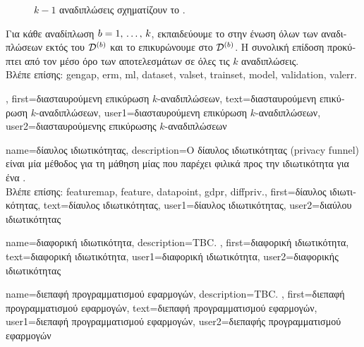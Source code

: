 {{\begin{figure}[H]
{{{			$k-1$ αναδιπλώσεις σχηματίζουν το} .		
		\label{fig_kfoldcv_dict}} }
		\end{figure} 
		\foreignlanguage{greek}{Για κάθε αναδίπλωση $b = 1, \,\ldots, \,k$, εκπαιδεύουμε το} 
		 \foreignlanguage{greek}{στην ένωση όλων των αναδιπλώσεων εκτός του 
		$\mathcal{D}^{(b)}$ και το επικυρώνουμε στο $\mathcal{D}^{(b)}$. 
		Η συνολική επίδοση προκύπτει από τον μέσο όρο των αποτελεσμάτων} 
		 \foreignlanguage{greek}{σε όλες τις $k$ αναδιπλώσεις}.
		\\
		\foreignlanguage{greek}{Βλέπε επίσης:} \gls{gengap}, \gls{erm}, \gls{ml}, \gls{dataset}, \gls{valset}, \gls{trainset}, \gls{model}, 
		\gls{validation}, \gls{valerr}.},
	first={\foreignlanguage{greek}{διασταυρούμενη επικύρωση $k$-αναδιπλώσεων}},
	text={\foreignlanguage{greek}{διασταυρούμενη επικύρωση $k$-αναδιπλώσεων}}, 
	user1={\foreignlanguage{greek}{διασταυρούμενη επικύρωση $k$-αναδιπλώσεων}}, %
	user2={\foreignlanguage{greek}{διασταυρούμενης επικύρωσης $k$-αναδιπλώσεων}} %
}

{name={\foreignlanguage{greek}{δίαυλος ιδιωτικότητας}},
 	description={\foreignlanguage{greek}{Ο δίαυλος ιδιωτικότητας} 
		(privacy funnel) \foreignlanguage{greek}{είναι μία μέθοδος για τη μάθηση μίας}  
		\foreignlanguage{greek}{που παρέχει φιλικά προς την ιδιωτικότητα}  \foreignlanguage{greek}{για 
		ένα}  \cite{PrivacyFunnel}.
		\\
		\foreignlanguage{greek}{Βλέπε επίσης:} \gls{featuremap}, \gls{feature}, \gls{datapoint}, \gls{gdpr}, \gls{diffpriv}.},
 	first={\foreignlanguage{greek}{δίαυλος ιδιωτικότητας}},
 	text={\foreignlanguage{greek}{δίαυλος ιδιωτικότητας}},
 	user1={\foreignlanguage{greek}{δίαυλος ιδιωτικότητας}}, %
 	user2={\foreignlanguage{greek}{διαύλου ιδιωτικότητας}} %
}

{name={\foreignlanguage{greek}{διαφορική ιδιωτικότητα}},
 	description={TBC. }, 
	first={\foreignlanguage{greek}{διαφορική ιδιωτικότητα}},
	text={\foreignlanguage{greek}{διαφορική ιδιωτικότητα}},
	user1={\foreignlanguage{greek}{διαφορική ιδιωτικότητα}}, %
   	user2={\foreignlanguage{greek}{διαφορικής ιδιωτικότητας}} %
}

{name={\foreignlanguage{greek}{διεπαφή προγραμματισμού εφαρμογών}},
	description={TBC. },
	first={\foreignlanguage{greek}{διεπαφή προγραμματισμού εφαρμογών}},
	text={\foreignlanguage{greek}{διεπαφή προγραμματισμού εφαρμογών}},
	user1={\foreignlanguage{greek}{διεπαφή προγραμματισμού εφαρμογών}}, %
	user2={\foreignlanguage{greek}{διεπαφής προγραμματισμού εφαρμογών}} %
}

